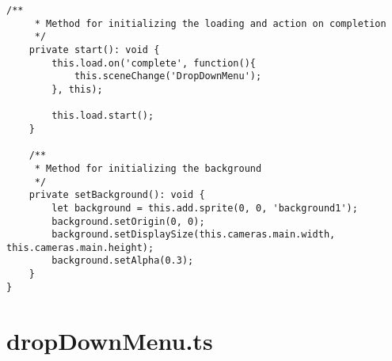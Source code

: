 \begin{lstlisting}[style=TypeScript, caption={preloadAsset.ts}]
    /**
     * Method for initializing the loading and action on completion
     */
    private start(): void {
        this.load.on('complete', function(){
            this.sceneChange('DropDownMenu');
        }, this);

        this.load.start();
    }

    /**
     * Method for initializing the background
     */
    private setBackground(): void {
        let background = this.add.sprite(0, 0, 'background1');
        background.setOrigin(0, 0);
        background.setDisplaySize(this.cameras.main.width, this.cameras.main.height);
        background.setAlpha(0.3);
    }
}
\end{lstlisting}

\section{dropDownMenu.ts}\label{sec:dropdownmenu.ts}
